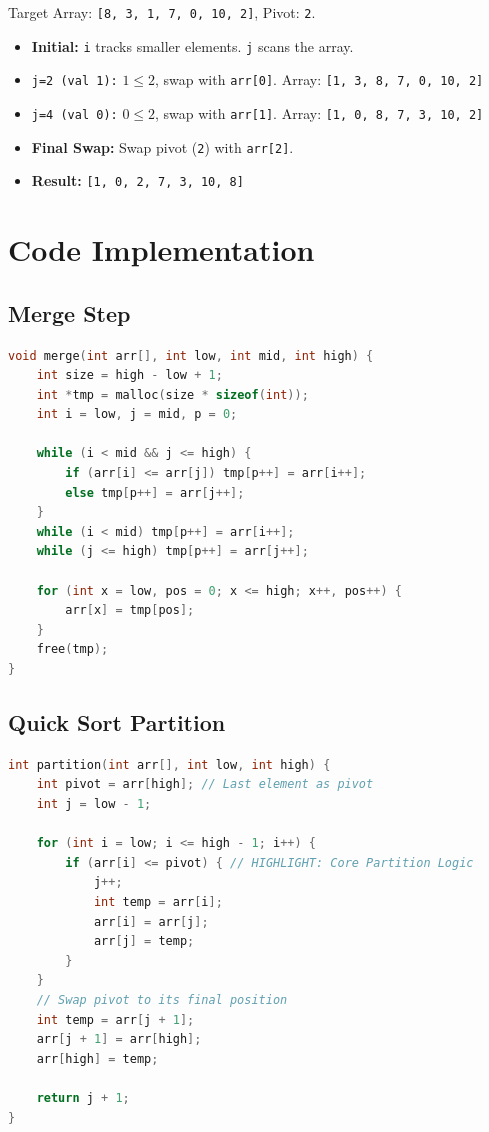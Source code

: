 \begin{example}
    Target Array: \texttt{[8, 3, 1, 7, 0, 10, 2]}, Pivot: \texttt{2}.
    \begin{itemize}
        \item \textbf{Initial:} \texttt{i} tracks smaller elements. \texttt{j} scans the array.
        \item \texttt{j=2 (val 1):} $1 \le 2$, swap with \texttt{arr[0]}. Array: \texttt{[1, 3, 8, 7, 0, 10, 2]}
        \item \texttt{j=4 (val 0):} $0 \le 2$, swap with \texttt{arr[1]}. Array: \texttt{[1, 0, 8, 7, 3, 10, 2]}
        \item \textbf{Final Swap:} Swap pivot (\texttt{2}) with \texttt{arr[2]}.
        \item \textbf{Result:} \texttt{[1, 0, 2, 7, 3, 10, 8]}
    \end{itemize}
\end{example}

\section{Code Implementation}

\subsection{Merge Step}
\begin{lstlisting}[language=C, caption=Merge Step Implementation]
void merge(int arr[], int low, int mid, int high) {
    int size = high - low + 1;
    int *tmp = malloc(size * sizeof(int));
    int i = low, j = mid, p = 0;

    while (i < mid && j <= high) {
        if (arr[i] <= arr[j]) tmp[p++] = arr[i++];
        else tmp[p++] = arr[j++];
    }
    while (i < mid) tmp[p++] = arr[i++];
    while (j <= high) tmp[p++] = arr[j++];

    for (int x = low, pos = 0; x <= high; x++, pos++) {
        arr[x] = tmp[pos];
    }
    free(tmp);
}
\end{lstlisting}

\subsection{Quick Sort Partition}
\begin{lstlisting}[language=C, caption=Quick Sort Partition Step]
int partition(int arr[], int low, int high) {
    int pivot = arr[high]; // Last element as pivot
    int j = low - 1; 
    
    for (int i = low; i <= high - 1; i++) {
        if (arr[i] <= pivot) { // HIGHLIGHT: Core Partition Logic
            j++;
            int temp = arr[i];
            arr[i] = arr[j];
            arr[j] = temp;
        }
    } 
    // Swap pivot to its final position
    int temp = arr[j + 1];
    arr[j + 1] = arr[high];
    arr[high] = temp;
    
    return j + 1;
}
\end{lstlisting}

